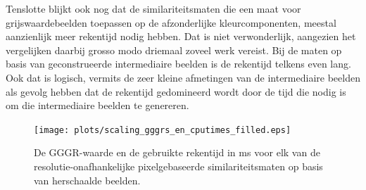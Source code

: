 
Tenslotte blijkt ook nog dat de similariteitsmaten die een maat voor grijswaardebeelden 
toepassen op de afzonderlijke kleurcomponenten, meestal aanzienlijk meer rekentijd nodig hebben. 
Dat is niet verwonderlijk, aangezien het vergelijken daarbij grosso modo driemaal zoveel werk vereist.
Bij de maten op basis van geconstrueerde intermediaire beelden is de rekentijd telkens even
lang. Ook dat is logisch, vermits de zeer kleine afmetingen van de intermediaire beelden als
gevolg hebben dat de rekentijd gedomineerd wordt door de tijd die nodig is om die 
intermediaire beelden te genereren.


\begin{figure}[tbp]
\begin{center}
\texttt{[image: plots/scaling\_gggrs\_en\_cputimes\_filled.eps]}
\caption{\label{fig:scaling_gggrs_en_cputimes}De GGGR-waarde en de gebruikte rekentijd in ms voor elk van de resolutie-onafhankelijke pixelgebaseerde similariteitsmaten op basis van herschaalde beelden.}
\end{center}
\end{figure}

